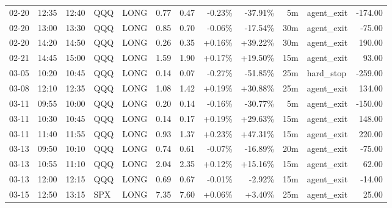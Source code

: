 \documentclass[11pt,a4paper]{article}
\begin{document}
\begin{center}
\begin{longtable}{>{\color{txtmain}}l l l l l r r r r r >{\color{txtmain}}l r}
02-20 & 12:35 & 12:40 & QQQ & LONG & 0.77 & 0.47 & \textcolor{lossred}{-0.23\%} & \textcolor{lossred}{-37.91\%} & 5m & agent\_exit & \textcolor{lossred}{-174.00} \\
02-20 & 13:00 & 13:30 & QQQ & LONG & 0.85 & 0.70 & \textcolor{lossred}{-0.06\%} & \textcolor{lossred}{-17.54\%} & 30m & agent\_exit & \textcolor{lossred}{-75.00} \\
02-20 & 14:20 & 14:50 & QQQ & LONG & 0.26 & 0.35 & \textcolor{wingreen}{+0.16\%} & \textcolor{wingreen}{+39.22\%} & 30m & agent\_exit & \textcolor{wingreen}{190.00} \\
02-21 & 14:45 & 15:00 & QQQ & LONG & 1.59 & 1.90 & \textcolor{wingreen}{+0.17\%} & \textcolor{wingreen}{+19.50\%} & 15m & agent\_exit & \textcolor{wingreen}{93.00} \\
03-05 & 10:20 & 10:45 & QQQ & LONG & 0.14 & 0.07 & \textcolor{lossred}{-0.27\%} & \textcolor{lossred}{-51.85\%} & 25m & hard\_stop & \textcolor{lossred}{-259.00} \\
03-08 & 12:10 & 12:35 & QQQ & LONG & 1.08 & 1.42 & \textcolor{wingreen}{+0.19\%} & \textcolor{wingreen}{+30.88\%} & 25m & agent\_exit & \textcolor{wingreen}{134.00} \\
03-11 & 09:55 & 10:00 & QQQ & LONG & 0.20 & 0.14 & \textcolor{lossred}{-0.16\%} & \textcolor{lossred}{-30.77\%} & 5m & agent\_exit & \textcolor{lossred}{-150.00} \\
03-11 & 10:30 & 10:45 & QQQ & LONG & 0.14 & 0.17 & \textcolor{wingreen}{+0.19\%} & \textcolor{wingreen}{+29.63\%} & 15m & agent\_exit & \textcolor{wingreen}{148.00} \\
03-11 & 11:40 & 11:55 & QQQ & LONG & 0.93 & 1.37 & \textcolor{wingreen}{+0.23\%} & \textcolor{wingreen}{+47.31\%} & 15m & agent\_exit & \textcolor{wingreen}{220.00} \\
03-13 & 09:50 & 10:10 & QQQ & LONG & 0.74 & 0.61 & \textcolor{lossred}{-0.07\%} & \textcolor{lossred}{-16.89\%} & 20m & agent\_exit & \textcolor{lossred}{-75.00} \\
03-13 & 10:55 & 11:10 & QQQ & LONG & 2.04 & 2.35 & \textcolor{wingreen}{+0.12\%} & \textcolor{wingreen}{+15.16\%} & 15m & agent\_exit & \textcolor{wingreen}{62.00} \\
03-13 & 12:00 & 12:15 & QQQ & LONG & 0.69 & 0.67 & \textcolor{lossred}{-0.01\%} & \textcolor{lossred}{-2.92\%} & 15m & agent\_exit & \textcolor{lossred}{-14.00} \\
03-15 & 12:50 & 13:15 & SPX & LONG & 7.35 & 7.60 & \textcolor{wingreen}{+0.06\%} & \textcolor{wingreen}{+3.40\%} & 25m & agent\_exit & \textcolor{wingreen}{25.00} \\

\end{longtable}
\end{center}
\end{document}
